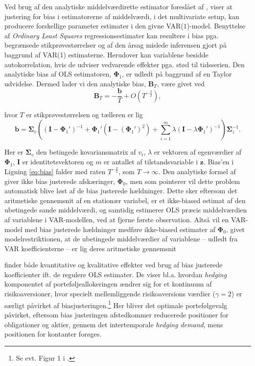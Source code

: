 \documentclass[
  a4paper,
  oneside]{memoir}
\begin{document}
Ved brug af den analytiske middelværdirette estimator foreslået af \citep{Pope1990}, viser \citep{Engsted2012} at justering for bias i estimatorerne af middelværdi, i det multivariate setup, kan producere forskellige parameter estimater i den givne VAR(\(1\))-model. Benyttelse af \emph{Ordinary Least Squares} regressionsestimater kan resultere i bias pga. begrænsede stikprøvestørrelser og af den årsag mislede inferensen gjort på baggrund af VAR(1) estimaterne. Herudover kan variablene besidde autokorrelation, hvis de udviser vedvarende effekter pga. stød til tidsserien. Den analytiske bias af OLS estimatoren, \(\bm{\Phi}_1\), er udledt på baggrund af en Taylor udvidelse. Dermed lader vi den analytiske bias, \(\bm{B}_T\), være givet ved
\begin{equation}
\bm{B}_T=-\frac{\bm{b}}{T}+ O\left(T^{-\frac{3}{2}}\right), \label{eq:bias}
\end{equation}

hvor \(T\) er stikprøvestørrelsen og tælleren er lig
\[\bm{b}=\bm{\Sigma}_v\left(\left(\bm{I}-\bm{\Phi}_1'\right)^{-1}+\bm{\Phi}_1'\left(\bm{I}-\left(\bm{\Phi}_1'\right)^2\right)+\sum_{i=1}^m \lambda \left(\bm{I}-\lambda\bm{\Phi}_1'\right)^{-1}\right)\bm{\Sigma}_z^{-1}.\]

Her er \(\bm{\Sigma}_v\) den betingede kovariansmatrix af \(v_t\), \(\lambda\) er vektoren af egenværdier af \(\bm{\Phi}_1\), \(\bm{I}\) er identitetsvektoren og \(m\) er antallet af tilstandsvariable i \(\bm{z}\). Bias'en i Ligning \eqref{eq:bias} falder med raten \(T^{-\frac{3}{2}}\), som \(T\rightarrow \infty\). Den analytiske formel af \citep{Pope1990} giver ikke bias justerede afskæringer, \(\bm{\Phi}_0\), men som \citep{Engsted2012} pointerer vil dette problem automatisk blive løst af de bias justerede hældninger. Dette sker eftersom det aritmetiske gennemsnit af en stationær variabel, er et ikke-biased estimat af den ubetingede sande middelværdi, og samtidig estimerer OLS præcis middelværdien af variablene i VAR-modellen, ved at fjerne første observation. Altså vil en VAR-model med bias justerede hældninger medføre ikke-biased estimater af \(\bm{\Phi}_0\), givet modelrestriktionen, at de ubetingede middelværdier af variablene -- udledt fra VAR koefficienterne -- er lig deres aritmetiske gennemsnit

\citep{Engsted2012} finder både kvantitative og kvalitative effekter ved brug af bias justerede koefficienter ift. de regulere OLS estimater. De viser bl.a. hvordan \emph{hedging} komponentet af porteføljeallokeringen ændrer sig for et kontinuum af risikoaversioner, hvor specielt mellemliggende risikoaversions værdier (\(\gamma=2\)) er særligt påvirket af biasjusteringen.\footnote{Se evt. Figur 1 i \citep{Engsted2012}.} Her bliver det optimale portefølgevalg påvirket, eftersom bias justeringen afstedkommer reducerede positioner for obligationer og aktier, gennem det intertemporale \emph{hedging demand}, mens positionen for kontanter forøges.
\end{document}
